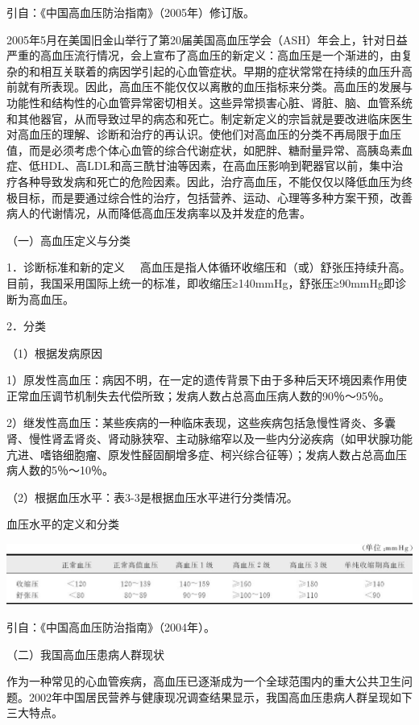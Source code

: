引自：《中国高血压防治指南》（2005年）修订版。

2005年5月在美国旧金山举行了第20届美国高血压学会（ASH）年会上，针对日益严重的高血压流行情况，会上宣布了高血压的新定义：高血压是一个渐进的，由复杂的和相互关联着的病因学引起的心血管症状。早期的症状常常在持续的血压升高前就有所表现。因此，高血压不能仅仅以离散的血压指标来分类。高血压的发展与功能性和结构性的心血管异常密切相关。这些异常损害心脏、肾脏、脑、血管系统和其他器官，从而导致过早的病态和死亡。制定新定义的宗旨就是要改进临床医生对高血压的理解、诊断和治疗的再认识。使他们对高血压的分类不再局限于血压值，而是必须考虑个体心血管的综合代谢症状，如肥胖、糖耐量异常、高胰岛素血症、低HDL、高LDL和高三酰甘油等因素，在高血压影响到靶器官以前，集中治疗各种导致发病和死亡的危险因素。因此，治疗高血压，不能仅仅以降低血压为终极目标，而是要通过综合性的治疗，包括营养、运动、心理等多种方案干预，改善病人的代谢情况，从而降低高血压发病率以及并发症的危害。

（一）高血压定义与分类

{1．诊断标准和新的定义}
　高血压是指人体循环收缩压和（或）舒张压持续升高。目前，我国采用国际上统一的标准，即收缩压≥140mmHg，舒张压≥90mmHg即诊断为高血压。

{2．分类}

（1）根据发病原因

1）原发性高血压：病因不明，在一定的遗传背景下由于多种后天环境因素作用使正常血压调节机制失去代偿所致；发病人数占总高血压病人数的90％～95％。

2）继发性高血压：某些疾病的一种临床表现，这些疾病包括急慢性肾炎、多囊肾、慢性肾盂肾炎、肾动脉狭窄、主动脉缩窄以及一些内分泌疾病（如甲状腺功能亢进、嗜铬细胞瘤、原发性醛固酮增多症、柯兴综合征等）；发病人数占总高血压病人数的5％～10％。

（2）根据血压水平：表3-3是根据血压水平进行分类情况。

\begin{table}[htbp]
\centering
\caption{血压水平的定义和分类}
\label{tab3-3}
\includegraphics{./images/Image00018.jpg}
\end{table}

引自：《中国高血压防治指南》（2004年）。

（二）我国高血压患病人群现状

作为一种常见的心血管疾病，高血压已逐渐成为一个全球范围内的重大公共卫生问题。2002年中国居民营养与健康现况调查结果显示，我国高血压患病人群呈现如下三大特点。

